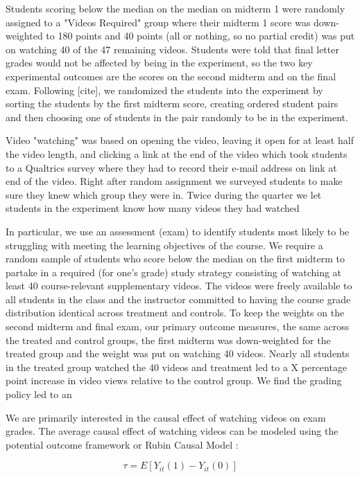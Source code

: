 \documentclass[12pt]{article}
\begin{document}
Students scoring below the median on the median on midterm 1 were randomly assigned to a "Videos Required" group where their midterm 1 score was down-weighted to 180 points and 40 points (all or nothing, so no partial credit) was put on watching 40 of the 47 remaining videos.  Students were told that final letter grades would not be affected by being in the experiment, so the two key experimental outcomes are the scores on the second midterm and on the final exam.  Following [cite], we randomized the students into the experiment by sorting the students by the first midterm score, creating ordered student pairs and then choosing one of students in the pair randomly to be in the experiment.  

Video "watching" was based on opening the video, leaving it open for at least half the video length, and clicking a link at the end of the video which took students to a Qualtrics survey where they had to record their e-mail address on link at end of the video.  Right after random assignment we surveyed students to make sure they knew which group they were in.  Twice during the quarter we let students in the experiment know how many videos they had watched 

In particular, we use an assessment (exam) to identify students most likely to be struggling with meeting the learning objectives of the course. We require a random sample of students who score below the median on the first midterm to partake in a required (for one's grade) study strategy consisting of watching at least 40 course-relevant supplementary videos.  The videos were freely available to all students in the class and the instructor committed to having the course grade distribution identical across treatment and controls.  To keep the weights on the second midterm and final exam, our primary outcome measures, the same across the treated and control groups, the first midterm was down-weighted for the treated group and the weight was put on watching 40 videos. Nearly all students in the treated group watched the 40 videos and treatment led to a  X percentage point increase in video views relative to the control group. We find the grading policy led to an 



We are primarily interested in the causal effect of watching videos on exam grades. The average causal effect of watching videos can be modeled using the potential outcome framework or Rubin Causal Model \parencite{ir2015}:

\begin{equation}
	\tau = E[Y_{it}(1) - Y_{it}(0)]
\end{equation}
\end{document}
